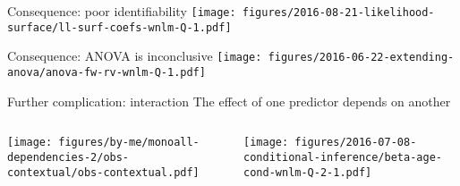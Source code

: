 \documentclass{beamer}
\newcommand{\platefigscale}[0]{0.7}
\newcommand{\ownfigscale}[0]{0.4}
\begin{document}
\begin{frame}{Consequence: poor identifiability}
\texttt{[image: figures/2016-08-21-likelihood-surface/ll-surf-coefs-wnlm-Q-1.pdf]}
\end{frame}

\begin{frame}{Consequence: ANOVA is inconclusive}
\texttt{[image: figures/2016-06-22-extending-anova/anova-fw-rv-wnlm-Q-1.pdf]}
\end{frame}

\begin{frame}[label=interaction]{Further complication: interaction}
{The effect of one predictor depends on another}
\begin{columns}[t]
\begin{column}{0.4\textwidth}

\texttt{[image: figures/by-me/monoall-dependencies-2/obs-contextual/obs-contextual.pdf]}
\end{column}

\begin{column}{0.6\textwidth}

\texttt{[image: figures/2016-07-08-conditional-inference/beta-age-cond-wnlm-Q-2-1.pdf]}
\end{column}
\end{columns}
\end{frame}
\end{document}
